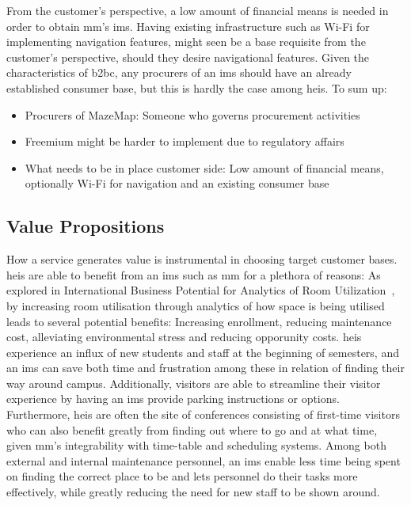 From the customer's perspective, a low amount of financial means is needed in order to obtain \gls{mm}'s \gls{ims}. Having existing infrastructure such as Wi-Fi for implementing navigation features, might seen be a base requisite from the customer's perspective, should they desire navigational features. Given the characteristics of \gls{b2bc}, any procurers of an \gls{ims} should have an already established consumer base, but this is hardly the case among \glspl{hei}. To sum up:


\begin{itemize}
    \item Procurers of MazeMap: Someone who governs procurement activities
    \item Freemium might be harder to implement due to regulatory affairs
    \item What needs to be in place customer side: Low amount of financial means, optionally Wi-Fi for navigation and an existing consumer base 
\end{itemize}

\subsection{Value Propositions}
How a service generates value is instrumental in choosing target customer bases. \glspl{hei} are able to benefit from an \gls{ims} such as \gls{mm} for a plethora of reasons: As explored in International Business Potential for Analytics of Room Utilization~\cite{karlbernhoffbinde2015}, by increasing room utilisation through analytics of how space is being utilised leads to several potential benefits: Increasing enrollment, reducing maintenance cost, alleviating environmental stress and reducing opporunity costs. \glspl{hei} experience an influx of new students and staff at the beginning of semesters, and an \gls{ims} can save both time and frustration among these in relation of finding their way around campus. Additionally, visitors are able to streamline their visitor experience by having an \gls{ims} provide parking instructions or options. Furthermore, \glspl{hei} are often the site of conferences consisting of first-time visitors who can also benefit greatly from finding out where to go and at what time, given \gls{mm}'s integrability with time-table and scheduling systems. Among both external and internal maintenance personnel, an \gls{ims} enable less time being spent on finding the correct place to be and lets personnel do their tasks more effectively, while greatly reducing the need for new staff to be shown around. 


